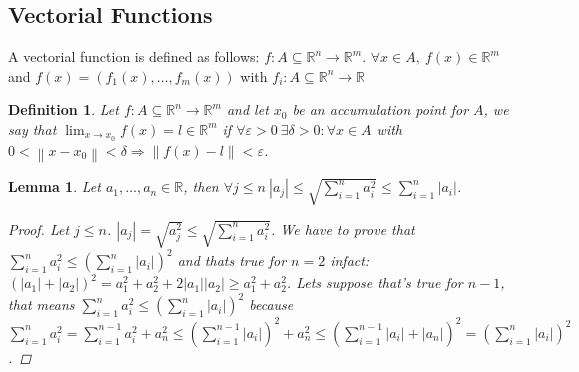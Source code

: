 \documentclass{article}
\newtheorem{lemma}{Lemma}
\newtheorem{definition}{Definition}
\begin{document}
        \subsection*{Vectorial Functions}
            A vectorial function is defined as follows: $f:A \subseteq \mathbb{R}^n \rightarrow \mathbb{R}^m$. $\forall x \in A, \ f(x) \in  \mathbb{R}^m$ and $f(x) = (f_1(x),\dots,f_m(x))$ with $f_i:A \subseteq \mathbb{R}^n \rightarrow \mathbb{R}$
            \begin{definition}
                Let $f:A \subseteq \mathbb{R}^n \rightarrow \mathbb{R}^m$ and let $x_0$ be an accumulation point for $A$, we say that $\lim_{x \to x_0}f(x) = l \in \mathbb{R}^m$ if $\forall \varepsilon >0 \ \exists \delta > 0: \forall x\in A$ with $0 < \left\lVert x - x_0 \right\rVert < \delta \Rightarrow \left\lVert f(x) - l\right\rVert < \varepsilon $.
            \end{definition}
            \begin{lemma}
                Let $a_1,\dots,a_n \in \mathbb{R}$, then $\forall j \leq n \ \left\lvert a_j \right\rvert \leq \sqrt{\sum_{i = 1}^{n}a_i^2} \leq \sum_{i = 1}^{n}\left\lvert a_i \right\rvert$.
                \begin{proof}
                    Let $j \leq n$. $\left\lvert a_j \right\rvert = \sqrt{a_j^2} \leq \sqrt{\sum_{i = 1}^{n} a_i^2 }$. We have to prove that $\sum_{i = 1}^{n} a_i^2 \leq \left( \sum_{i = 1}^{n}\left\lvert a_i \right\rvert \right)^2 $  and thats true for $n = 2$ infact: $\left(\left\lvert a_1 \right\rvert + \left\lvert a_2 \right\rvert  \right)^2 = a_1^2 + a_2^2 + 2\left\lvert a_1 \right\rvert\left\lvert a_2 \right\rvert \geq a_1^2 + a_2^2$. Lets suppose that's true for $n - 1$, that means $\sum_{i = 1}^{n}a_i^2 \leq \left(\sum_{i = 1}^{n}\left\lvert a_i \right\rvert\right)^2$ because $\sum_{i = 1}^{n}a_i^2  = \sum_{i = 1}^{n-1}a_i^2 + a_n^2 \leq \left(\sum_{i = 1}^{n - 1}\left\lvert a_i \right\rvert\right)^2 + a_n^2 \leq \left(\sum_{i = 1}^{n - 1}\left\lvert a_i \right\rvert + \left\lvert a_n \right\rvert \right)^2 = \left(\sum_{i = 1}^{n}\left\lvert a_i \right\rvert\right)^2$.      
                \end{proof}
            \end{lemma}
\end{document}
